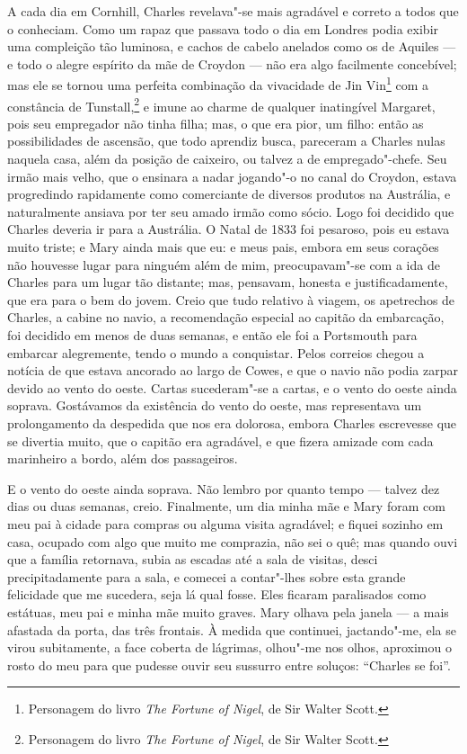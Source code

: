 A cada dia em Cornhill, Charles revelava"-se mais agradável e correto a
todos que o conheciam. Como um rapaz que passava todo o dia em Londres
podia exibir uma compleição tão luminosa, e cachos de cabelo anelados
como os de Aquiles --- e todo o alegre espírito da mãe de Croydon --- não
era algo facilmente concebível; mas ele se tornou uma perfeita
combinação da vivacidade de Jin Vin\footnote{Personagem do livro
  \textit{The Fortune of Nigel}, de Sir Walter Scott.} com
a constância de Tunstall,\footnote{Personagem do livro \textit{The Fortune
  of Nigel}, de Sir Walter Scott.} e imune ao charme de
qualquer inatingível Margaret, pois seu empregador não tinha filha; mas,
o que era pior, um filho: então as possibilidades de ascensão, que todo
aprendiz busca, pareceram a Charles nulas naquela casa, além da posição
de caixeiro, ou talvez a de empregado"-chefe. Seu irmão mais velho, que o
ensinara a nadar jogando"-o no canal do Croydon, estava progredindo
rapidamente como comerciante de diversos produtos na Austrália, e
naturalmente ansiava por ter seu amado irmão como sócio. Logo foi
decidido que Charles deveria ir para a Austrália. O Natal de 1833 foi
pesaroso, pois eu estava muito triste; e Mary ainda mais que eu: e meus
pais, embora em seus corações não houvesse lugar para ninguém além de
mim, preocupavam"-se com a ida de Charles para um lugar tão distante;
mas, pensavam, honesta e justificadamente, que era para o bem do jovem.
Creio que tudo relativo à viagem, os apetrechos de Charles, a cabine no
navio, a recomendação especial ao capitão da embarcação, foi decidido em
menos de duas semanas, e então ele foi a Portsmouth para embarcar
alegremente, tendo o mundo a conquistar. Pelos correios chegou a notícia
de que estava ancorado ao largo de Cowes, e que o navio não podia zarpar
devido ao vento do oeste. Cartas sucederam"-se a cartas, e o vento do
oeste ainda soprava. Gostávamos da existência do vento do oeste, mas
representava um prolongamento da despedida que nos era dolorosa, embora
Charles escrevesse que se divertia muito, que o capitão era agradável, e
que fizera amizade com cada marinheiro a bordo, além dos passageiros.

E o vento do oeste ainda soprava. Não lembro por quanto tempo --- \label{157}
talvez dez dias ou duas semanas, creio. Finalmente, um dia minha mãe e
Mary foram com meu pai à cidade para compras ou alguma visita agradável;
e fiquei sozinho em casa, ocupado com algo que muito me comprazia, não
sei o quê; mas quando ouvi que a família retornava, subia as escadas até
a sala de visitas, desci precipitadamente para a sala, e comecei a
contar"-lhes sobre esta grande felicidade que me sucedera, seja lá qual
fosse. Eles ficaram paralisados como estátuas, meu pai e minha mãe muito
graves. Mary olhava pela janela --- a mais afastada da porta, das três
frontais. À medida que continuei, jactando"-me, ela se virou subitamente,
a face coberta de lágrimas, olhou"-me nos olhos, aproximou o rosto do meu
para que pudesse ouvir seu sussurro entre soluços: ``Charles se foi''.

